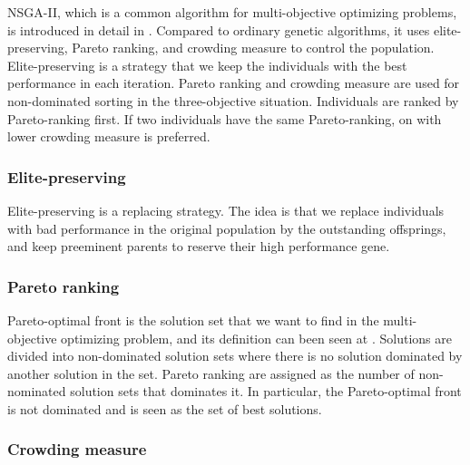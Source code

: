\documentclass[conference]{IEEEtran}
\begin{document}
   NSGA-II, which is a common algorithm for multi-objective optimizing problems, is introduced in detail in \cite{996017}. Compared to ordinary genetic algorithms, it uses elite-preserving, Pareto ranking, and crowding measure to control the population. Elite-preserving is a strategy that we keep the individuals with the best performance in each iteration. Pareto ranking and crowding measure are used for non-dominated sorting in the three-objective situation. Individuals are ranked by Pareto-ranking first. If two individuals have the same Pareto-ranking, on with lower crowding measure is preferred.
   
	 \subsubsection{Elite-preserving}
	 
	 Elite-preserving is a replacing strategy. The idea is that we replace individuals with bad performance in the original population by the outstanding offsprings, and keep preeminent parents to reserve their high performance gene. 
	 
	 \subsubsection{Pareto ranking}
	 
   Pareto-optimal front is the solution set that we want to find in the multi-objective optimizing problem, and its definition can been seen at \cite{ishibuchi2007analysis}. Solutions are divided into  non-dominated solution sets where there is no solution dominated by another solution in the set. Pareto ranking are assigned as the number of non-nominated solution sets that dominates it. In particular, the Pareto-optimal front is not dominated and is seen as the set of best solutions.
   
	 
	 \subsubsection{Crowding measure}
	 
\end{document}
